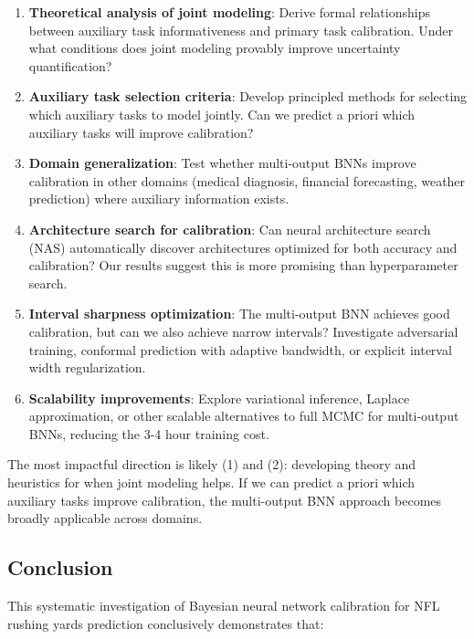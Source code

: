\begin{enumerate}
    \item \textbf{Theoretical analysis of joint modeling}: Derive formal relationships between auxiliary task informativeness and primary task calibration. Under what conditions does joint modeling provably improve uncertainty quantification?

    \item \textbf{Auxiliary task selection criteria}: Develop principled methods for selecting which auxiliary tasks to model jointly. Can we predict a priori which auxiliary tasks will improve calibration?

    \item \textbf{Domain generalization}: Test whether multi-output BNNs improve calibration in other domains (medical diagnosis, financial forecasting, weather prediction) where auxiliary information exists.

    \item \textbf{Architecture search for calibration}: Can neural architecture search (NAS) automatically discover architectures optimized for both accuracy and calibration? Our results suggest this is more promising than hyperparameter search.

    \item \textbf{Interval sharpness optimization}: The multi-output BNN achieves good calibration, but can we also achieve narrow intervals? Investigate adversarial training, conformal prediction with adaptive bandwidth, or explicit interval width regularization.

    \item \textbf{Scalability improvements}: Explore variational inference, Laplace approximation, or other scalable alternatives to full MCMC for multi-output BNNs, reducing the 3-4 hour training cost.
\end{enumerate}

The most impactful direction is likely (1) and (2): developing theory and heuristics for when joint modeling helps. If we can predict a priori which auxiliary tasks improve calibration, the multi-output BNN approach becomes broadly applicable across domains.

\subsection{Conclusion}

This systematic investigation of Bayesian neural network calibration for NFL rushing yards prediction conclusively demonstrates that:


